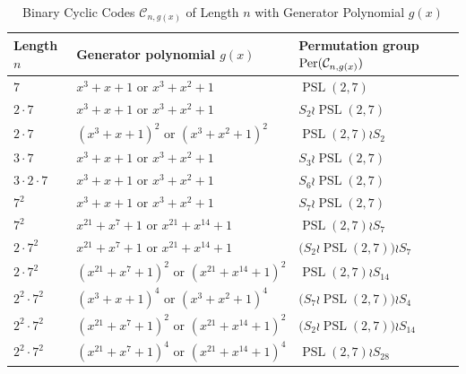 \documentclass[journal,12pt,onecolumn]{IEEEtran}
\begin{document}
\begin{table}[!t]
    \caption{Binary Cyclic Codes $\mathcal{C}_{n,g(x)}$ of Length $n$ with Generator Polynomial $g(x)$}
	\centering
    \renewcommand{\arraystretch}{1.5}
	\begin{tabular}{lll}
        \toprule[1.2pt]
		Length $n$ & Generator polynomial $g(x)$ & Permutation group ${\rm Per}(\mathcal{C}_{n,g(x)})$ \\
        \midrule[1.2pt]
		$7$ & $x^3+x+1\text{ or }x^3+x^2+1$ & $\operatorname{PSL}(2,7)$ \\   
        
		$2\cdot 7$ & $x^3+x+1\text{ or }x^3+x^2+1$ & $S_2 \wr \operatorname{PSL}(2,7)$ \\   
        
		$2\cdot 7$ & $(x^3+x+1)^2\text{ or }(x^3+x^2+1)^2$ & $\operatorname{PSL}(2,7) \wr S_2$ \\   

        $3\cdot 7$ & $x^3+x+1\text{ or }x^3+x^2+1$ & $S_3 \wr \operatorname{PSL}(2,7)$ \\   

        $3\cdot 2\cdot 7$ & $x^3+x+1\text{ or }x^3+x^2+1$ & $S_{6} \wr \operatorname{PSL}(2,7) $ \\   
        
		$7^2$ & $x^3+x+1\text{ or }x^3+x^2+1$ & $S_7 \wr \operatorname{PSL}(2,7)$ \\   
        
		$7^2$ & $x^{21}+x^7+1\text{ or }x^{21}+x^{14}+1$ & $\operatorname{PSL}(2,7) \wr S_7$ \\   
        
        $2\cdot 7^2$ & $x^{21}+x^7+1\text{ or }x^{21}+x^{14}+1$ & $\big(S_2 \wr \operatorname{PSL}(2,7)\big) \wr S_7$ \\   
        
		$2\cdot 7^2$ & $(x^{21}+x^7+1)^2\text{ or }(x^{21}+x^{14}+1)^2$ & $\operatorname{PSL}(2,7) \wr S_{14}$ \\   

        $2^2\cdot 7^2$ & $(x^3+x+1)^4\text{ or }(x^3+x^2+1)^4$ & $\big(S_7 \wr \operatorname{PSL}(2,7)\big) \wr S_4$ \\   
        
		$2^2\cdot 7^2$ & $(x^{21}+x^7+1)^2\text{ or }(x^{21}+x^{14}+1)^2$ & $\big(S_2 \wr \operatorname{PSL}(2,7)\big) \wr S_{14}$ \\   

        $2^2\cdot 7^2$ & $(x^{21}+x^7+1)^4\text{ or }(x^{21}+x^{14}+1)^4$ & $ \operatorname{PSL}(2,7) \wr S_{28}$ \\   


\end{tabular}
\end{table}
\end{document}
